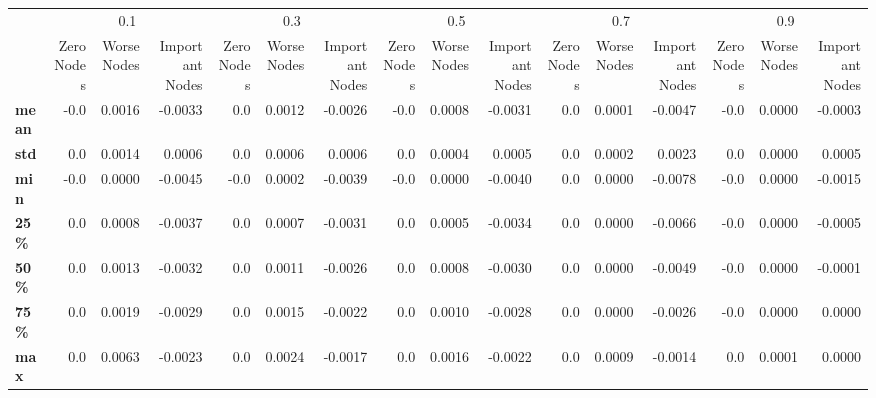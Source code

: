 \begin{tabular}{lrrrrrrrrrrrrrrr}
\toprule
{} & \multicolumn{3}{c}{0.1} & \multicolumn{3}{c}{0.3} & \multicolumn{3}{c}{0.5} & \multicolumn{3}{c}{0.7} & \multicolumn{3}{c}{0.9} \\
{} & Zero Nodes & Worse Nodes & Important Nodes & Zero Nodes & Worse Nodes & Important Nodes & Zero Nodes & Worse Nodes & Important Nodes & Zero Nodes & Worse Nodes & Important Nodes & Zero Nodes & Worse Nodes & Important Nodes \\
\midrule
\textbf{mean} &       -0.0 &      0.0016 &         -0.0033 &        0.0 &      0.0012 &         -0.0026 &       -0.0 &      0.0008 &         -0.0031 &        0.0 &      0.0001 &         -0.0047 &       -0.0 &      0.0000 &         -0.0003 \\
\textbf{std } &        0.0 &      0.0014 &          0.0006 &        0.0 &      0.0006 &          0.0006 &        0.0 &      0.0004 &          0.0005 &        0.0 &      0.0002 &          0.0023 &        0.0 &      0.0000 &          0.0005 \\
\textbf{min } &       -0.0 &      0.0000 &         -0.0045 &       -0.0 &      0.0002 &         -0.0039 &       -0.0 &      0.0000 &         -0.0040 &        0.0 &      0.0000 &         -0.0078 &       -0.0 &      0.0000 &         -0.0015 \\
\textbf{25\% } &        0.0 &      0.0008 &         -0.0037 &        0.0 &      0.0007 &         -0.0031 &        0.0 &      0.0005 &         -0.0034 &        0.0 &      0.0000 &         -0.0066 &       -0.0 &      0.0000 &         -0.0005 \\
\textbf{50\% } &        0.0 &      0.0013 &         -0.0032 &        0.0 &      0.0011 &         -0.0026 &        0.0 &      0.0008 &         -0.0030 &        0.0 &      0.0000 &         -0.0049 &       -0.0 &      0.0000 &         -0.0001 \\
\textbf{75\% } &        0.0 &      0.0019 &         -0.0029 &        0.0 &      0.0015 &         -0.0022 &        0.0 &      0.0010 &         -0.0028 &        0.0 &      0.0000 &         -0.0026 &       -0.0 &      0.0000 &          0.0000 \\
\textbf{max } &        0.0 &      0.0063 &         -0.0023 &        0.0 &      0.0024 &         -0.0017 &        0.0 &      0.0016 &         -0.0022 &        0.0 &      0.0009 &         -0.0014 &        0.0 &      0.0001 &          0.0000 \\
\bottomrule
\end{tabular}
